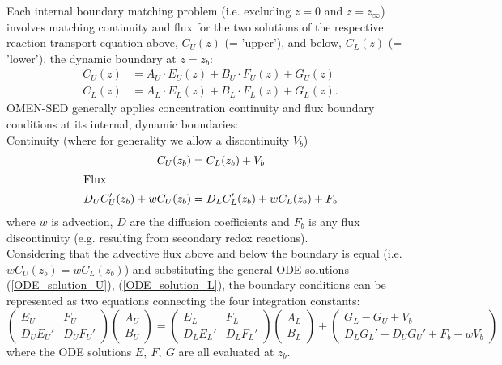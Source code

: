\documentclass[gmd, manuscript]{copernicus}
\begin{document}
Each internal boundary matching problem (i.e. excluding $z=0$ and $z=z_\infty$) involves matching continuity and flux for the two solutions of the respective 
reaction-transport equation above, $C_U(z)$ (= 'upper'), and below, $C_L(z)$ (= 'lower'), the dynamic boundary at $z = z_b$:
\begin{align}
C_U(z) &= A_U \cdot E_U(z) + B_U \cdot F_U(z) + G_U(z) \label{ODE_solution_U}\\
C_L(z) &= A_L \cdot E_L(z) + B_L \cdot F_L(z) + G_L(z) .\label{ODE_solution_L}
\end{align}
OMEN-SED generally applies concentration continuity and flux boundary conditions at its internal, dynamic boundaries: \\
Continuity (where for generality we allow a discontinuity $V_b$) 
\begin{align}
  C_U(z_b) &= C_L(z_b) + V_b	\\
\intertext{Flux}
 D_U C_U'(z_b) + wC_U(z_b) &=  D_LC_L'(z_b) + wC_L(z_b) + F_b
\end{align}
where $w$ is advection, $D$ are the diffusion coefficients and $F_b$ is any flux discontinuity (e.g. resulting from secondary redox reactions).\\[1em]
Considering that the advective flux above and below the boundary is equal (i.e. $wC_U(z_b) = wC_L(z_b)$) and substituting the general ODE solutions (\ref{ODE_solution_U}), (\ref{ODE_solution_L}), 
the boundary conditions can be represented as two equations connecting the four integration constants:
\begin{equation}
 \begin{pmatrix} E_U & F_U \\ D_UE_U' & D_UF_U' \end{pmatrix} \begin{pmatrix} A_U \\ B_U \end{pmatrix} = \begin{pmatrix} E_L & F_L \\ D_LE_L' & D_LF_L' \end{pmatrix} \begin{pmatrix} A_L \\ B_L \end{pmatrix} 
 + \begin{pmatrix} G_L - G_U + V_b \\ D_LG_L' - D_UG_U' + F_b - wV_b\end{pmatrix} \label{Solution_BC}
\end{equation}
where the ODE solutions $E,\ F,\ G$ are all evaluated at $z_b$.\\[1em]
\end{document}
